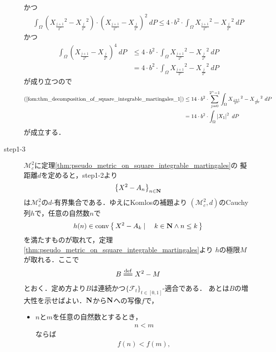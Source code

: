 \begin{sketch}
\begin{description}
				かつ
				\begin{align}
					\int_\Omega \left( {X_{\frac{j+1}{2^n}}}^{2} - {X_{\frac{j}{2^n}}}^{2} \right) \cdot \left(X_{\frac{j+1}{2^n}} - X_{\frac{j}{2^n}}\right)^{2}\ dP
					\leq 4 \cdot b^{2} \cdot \int_\Omega {X_{\frac{j+1}{2^n}}}^{2} - {X_{\frac{j}{2^n}}}^{2}\ dP
				\end{align}
				かつ
				\begin{align}
					\int_\Omega \left(X_{\frac{j+1}{2^n}} - X_{\frac{j}{2^n}}\right)^{4}\ dP
					&\leq 4 \cdot b^{2} \cdot \int_\Omega {X_{\frac{j+1}{2^n}}}^{2} - {X_{\frac{j}{2^n}}}^{2}\ dP \\
					&= 4 \cdot b^{2} \cdot \int_\Omega {X_{\frac{j+1}{2^n}}}^{2} - {X_{\frac{j}{2^n}}}^{2}\ dP
				\end{align}
				が成り立つので
				\begin{align}
					(\refeq{fom:thm_decomposition_of_square_integrable_martingales_1})
					&\leq 14 \cdot b^{2} \cdot \sum_{j=0}^{2^n-1} \int_\Omega {X_{\frac{j+1}{2^n}}}^{2} - {X_{\frac{j}{2^n}}}^{2}\ dP \\
					&= 14 \cdot b^{2} \cdot \int_\Omega \left|X_{1}\right|^{2}\ dP
				\end{align}
				が成立する．
				
			\item[step1-3]
				$\mathscr{M}_{c}^{2}$に定理\ref{thm:pseudo_metric_on_square_integrable_martingales}の
				擬距離$d$を定めると，step1-2より
				\begin{align}
					\left\{X^{2} - A_{n}\right\}_{n \in \mathbf{N}}
				\end{align}
				は$\mathscr{M}_{c}^{2}$の$d$-有界集合である．ゆえにKomlosの補題より
				$\left(\mathscr{M}_{c}^{2},d\right)$のCauchy列$h$で，任意の自然数$n$で
				\begin{align}
					h(n) \in \operatorname*{conv} \left\{\, X^{2}-A_{k} \mid \quad k \in \mathbf{N} \wedge n \leq k\, \right\}
					\label{fom:thm_decomposition_of_square_integrable_martingales_5}
				\end{align}
				を満たすものが取れて，定理\ref{thm:pseudo_metric_on_square_integrable_martingales}より
				$h$の極限$M$が取れる．ここで
				\begin{align}
					B \defeq X^{2} - M
				\end{align}
				とおく．定め方より$B$は連続かつ$\{\mathscr{F}_t\}_{t \in [0,1]}$-適合である．
				あとは$B$の増大性を示せばよい．$\mathbf{N}$から$\mathbf{N}$への写像$f$で，
				\begin{itemize}
					\item $n$と$m$を任意の自然数とするとき，
						\begin{align}
							n < m
						\end{align}
						ならば
						\begin{align}
							f(n) < f(m),
						\end{align}
						

\end{itemize}
\end{description}
\end{sketch}
